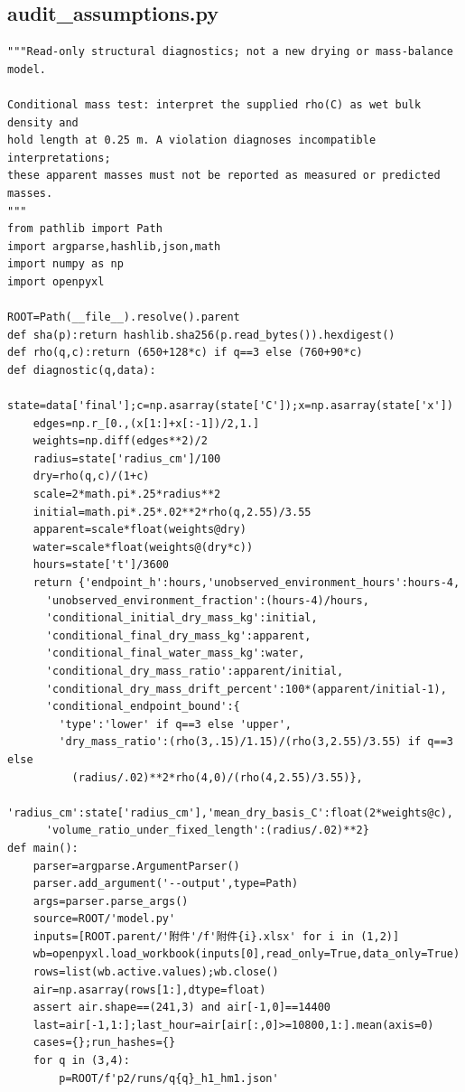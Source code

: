 \subsection{audit\_assumptions.py}
\begin{verbatim}
"""Read-only structural diagnostics; not a new drying or mass-balance model.

Conditional mass test: interpret the supplied rho(C) as wet bulk density and
hold length at 0.25 m. A violation diagnoses incompatible interpretations;
these apparent masses must not be reported as measured or predicted masses.
"""
from pathlib import Path
import argparse,hashlib,json,math
import numpy as np
import openpyxl

ROOT=Path(__file__).resolve().parent
def sha(p):return hashlib.sha256(p.read_bytes()).hexdigest()
def rho(q,c):return (650+128*c) if q==3 else (760+90*c)
def diagnostic(q,data):
    state=data['final'];c=np.asarray(state['C']);x=np.asarray(state['x'])
    edges=np.r_[0.,(x[1:]+x[:-1])/2,1.]
    weights=np.diff(edges**2)/2
    radius=state['radius_cm']/100
    dry=rho(q,c)/(1+c)
    scale=2*math.pi*.25*radius**2
    initial=math.pi*.25*.02**2*rho(q,2.55)/3.55
    apparent=scale*float(weights@dry)
    water=scale*float(weights@(dry*c))
    hours=state['t']/3600
    return {'endpoint_h':hours,'unobserved_environment_hours':hours-4,
      'unobserved_environment_fraction':(hours-4)/hours,
      'conditional_initial_dry_mass_kg':initial,
      'conditional_final_dry_mass_kg':apparent,
      'conditional_final_water_mass_kg':water,
      'conditional_dry_mass_ratio':apparent/initial,
      'conditional_dry_mass_drift_percent':100*(apparent/initial-1),
      'conditional_endpoint_bound':{
        'type':'lower' if q==3 else 'upper',
        'dry_mass_ratio':(rho(3,.15)/1.15)/(rho(3,2.55)/3.55) if q==3 else
          (radius/.02)**2*rho(4,0)/(rho(4,2.55)/3.55)},
      'radius_cm':state['radius_cm'],'mean_dry_basis_C':float(2*weights@c),
      'volume_ratio_under_fixed_length':(radius/.02)**2}
def main():
    parser=argparse.ArgumentParser()
    parser.add_argument('--output',type=Path)
    args=parser.parse_args()
    source=ROOT/'model.py'
    inputs=[ROOT.parent/'附件'/f'附件{i}.xlsx' for i in (1,2)]
    wb=openpyxl.load_workbook(inputs[0],read_only=True,data_only=True)
    rows=list(wb.active.values);wb.close()
    air=np.asarray(rows[1:],dtype=float)
    assert air.shape==(241,3) and air[-1,0]==14400
    last=air[-1,1:];last_hour=air[air[:,0]>=10800,1:].mean(axis=0)
    cases={};run_hashes={}
    for q in (3,4):
        p=ROOT/f'p2/runs/q{q}_h1_hm1.json'

\end{verbatim}
